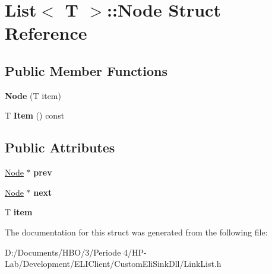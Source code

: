 \hypertarget{struct_list_1_1_node}{}\section{List$<$ T $>$\+:\+:Node Struct Reference}
\label{struct_list_1_1_node}
\subsection*{Public Member Functions}
\begin{DoxyCompactItemize}
\item 
\mbox{\label{struct_list_1_1_node_a86c57f740d2931d0043cb9880be4a98c}} 
{\bfseries Node} (T item)
\item 
\mbox{\label{struct_list_1_1_node_a2c4ae8e396eb7d7d1c6a5138e988873c}} 
T {\bfseries Item} () const
\end{DoxyCompactItemize}
\subsection*{Public Attributes}
\begin{DoxyCompactItemize}
\item 
\mbox{\label{struct_list_1_1_node_a4244396f9db815b7ac44224fe0e6075a}} 
\hyperlink{struct_list_1_1_node}{Node} $\ast$ {\bfseries prev}
\item 
\mbox{\label{struct_list_1_1_node_a78c5e241d5ba4f6a60ef63f018d3a0df}} 
\hyperlink{struct_list_1_1_node}{Node} $\ast$ {\bfseries next}
\item 
\mbox{\label{struct_list_1_1_node_a8597e74d9bfa74d160db7810b7e502a5}} 
T {\bfseries item}
\end{DoxyCompactItemize}


The documentation for this struct was generated from the following file\+:\begin{DoxyCompactItemize}
\item 
D\+:/\+Documents/\+H\+B\+O/3/\+Periode 4/\+H\+P-\/\+Lab/\+Development/\+E\+L\+I\+Client/\+Custom\+Eli\+Sink\+Dll/Link\+List.\+h\end{DoxyCompactItemize}

